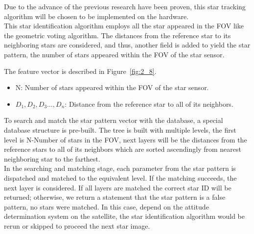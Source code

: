 \noindent Due to the advance of the previous research have been proven, this star tracking algorithm will be chosen to be implemented on the hardware. \\

\noindent This star identification algorithm employs all the star appeared in the FOV like the geometric voting algorithm. The distances from the reference star to its neighboring stars are considered, and thus, another field is added to yield the star pattern, the number of stars appeared within the FOV of the star sensor. \\


\noindent The feature vector is described in Figure~\ref{fig:2_8}.
\begin{center}
	\begin{itemize}
		\item N: Number of stars appeared within the FOV of the star sensor.
		\item $D_1, D_2, D_3…, D_n$: Distance from the reference star to all of its neighbors.
	\end{itemize}
\end{center}

\noindent To search and match the star pattern vector with the database, a special database structure is pre-built. The tree is built with multiple levels, the first level is N-Number of stars in the FOV, next layers will be the distances from the reference stars to all of its neighbors which are sorted ascendingly from nearest neighboring star to the farthest. \\

\noindent In the searching and matching stage, each parameter from the star pattern is dispatched and matched to the equivalent level. If the matching succeeds, the next layer is considered. If all layers are matched the correct star ID will be returned; otherwise, we return a statement that the star pattern is a false pattern, no stars were matched. In this case, depend on the attitude determination system on the satellite, the star identification algorithm would be rerun or skipped to proceed the next star image.


